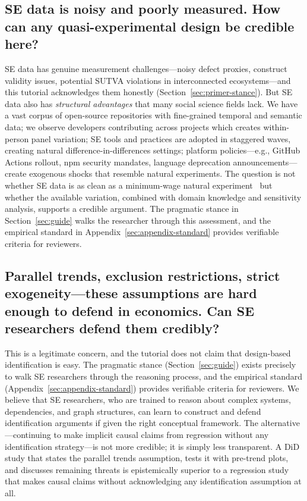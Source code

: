 
\subsection{SE data is noisy and poorly measured. How can any quasi-experimental design be credible here?}

SE data has genuine measurement challenges---noisy defect proxies, construct validity issues, potential SUTVA violations in interconnected ecosystems---and this tutorial acknowledges them honestly (Section~\ref{sec:primer-stance}).
But SE data also has \emph{structural advantages} that many social science fields lack.
We have a vast corpus of open-source repositories with fine-grained temporal and semantic data; we observe developers contributing across projects which creates within-person panel variation; SE tools and practices are adopted in staggered waves, creating natural difference-in-differences settings; platform policies---e.g., GitHub Actions rollout, npm security mandates, language deprecation announcements---create exogenous shocks that resemble natural experiments.
The question is not whether SE data is as clean as a minimum-wage natural experiment~\cite{card1994minimum} but whether the available variation, combined with domain knowledge and sensitivity analysis, supports a credible argument.
The pragmatic stance in Section~\ref{sec:guide} walks the researcher through this assessment, and the empirical standard in Appendix~\ref{sec:appendix-standard} provides verifiable criteria for reviewers.

\subsection{Parallel trends, exclusion restrictions, strict exogeneity---these assumptions are hard enough to defend in economics. Can SE researchers defend them credibly?}

This is a legitimate concern, and the tutorial does not claim that design-based identification is easy.
The pragmatic stance (Section~\ref{sec:guide}) exists precisely to walk SE researchers through the reasoning process, and the empirical standard (Appendix~\ref{sec:appendix-standard}) provides verifiable criteria for reviewers.
We believe that SE researchers, who are trained to reason about complex systems, dependencies, and graph structures, can learn to construct and defend identification arguments if given the right conceptual framework.
The alternative---continuing to make implicit causal claims from regression without any identification strategy---is not more credible; it is simply less transparent.
A DiD study that states the parallel trends assumption, tests it with pre-trend plots, and discusses remaining threats is epistemically superior to a regression study that makes causal claims without acknowledging any identification assumption at all.

